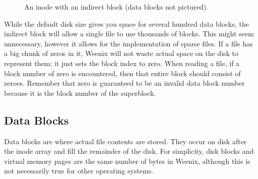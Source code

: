 \begin{figure}
    \centering
    \caption{An inode with an indirect block (data blocks not pictured).}
\end{figure}

While the default disk size gives you space for several hundred data blocks, the indirect block will allow a single file to use thousands of blocks. This might seem unnecessary, however it allows for the implementation of sparse files. If a file has a big chunk of zeros in it, Weenix will not waste actual space on the disk to represent them; it just sets the block index to zero. When reading a file, if a block number of zero is encountered, then that entire block should consist of zeroes. Remember that zero is guaranteed to be an invalid data block number because it is the block number of the superblock.

\subsection{Data Blocks} \label{datablocks}

Data blocks are where actual file contents are stored. They occur on disk after the inode array and fill the remainder of the disk. For simplicity, disk blocks and virtual memory pages are the same number of bytes in Weenix, although this is not necessarily true for other operating systems.

